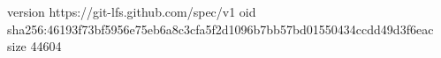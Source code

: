 version https://git-lfs.github.com/spec/v1
oid sha256:46193f73bf5956e75eb6a8c3cfa5f2d1096b7bb57bd01550434ccdd49d3f6eac
size 44604
